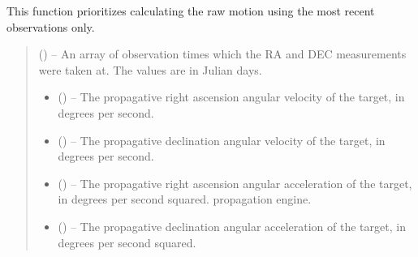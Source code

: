 \documentclass[letterpaper,11pt,english]{sphinxmanual}
\begin{document}
\begin{savenotes}
\begin{fulllineitems}
\begin{savenotes}
\begin{fulllineitems}
\sphinxAtStartPar
This function prioritizes calculating the raw motion using the most
recent observations only.
\begin{quote}\begin{description}
\sphinxAtStartPar
{} () – An array of observation times which the RA and DEC measurements
were taken at. The values are in Julian days.

\sphinxAtStartPar
\begin{itemize}
\item {} 
\sphinxAtStartPar
{} () – The propagative right ascension angular velocity of the target, in degrees
per second.

\item {} 
\sphinxAtStartPar
{} () – The propagative declination angular velocity of the target, in degrees per
second.

\item {} 
\sphinxAtStartPar
{} () – The propagative right ascension angular acceleration of the target, in
degrees per second squared.
propagation engine.

\item {} 
\sphinxAtStartPar
{} () – The propagative declination angular acceleration of the target, in
degrees per second squared.

\end{itemize}


\end{description}\end{quote}

\end{fulllineitems}\end{savenotes}



\end{fulllineitems}
\end{savenotes}
\end{document}
